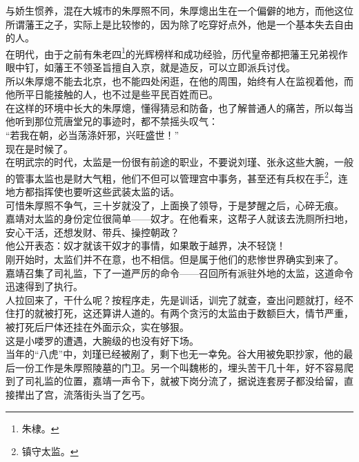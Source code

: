 \begin{multicols}{\theparacolNo}
与娇生惯养，混在大城市的朱厚照不同，朱厚熜出生在一个偏僻的地方，而他这位所谓藩王之子，实际上是比较惨的，因为除了吃穿好点外，他是一个基本失去自由的人。\\

在明代，由于之前有朱老四\footnote{朱棣。}的光辉榜样和成功经验，历代皇帝都把藩王兄弟视作眼中钉，如藩王不领圣旨擅自入京，就是造反，可以立即派兵讨伐。\\

所以朱厚熜不能去北京，也不能四处闲逛，在他的周围，始终有人在监视着他，而他所平日能接触的人，也不过是些平民百姓而已。\\

在这样的环境中长大的朱厚熜，懂得猜忌和防备，也了解普通人的痛苦，所以每当他听到那位荒唐堂兄的事迹时，都不禁摇头叹气：\\

“若我在朝，必当荡涤奸邪，兴旺盛世！”\\

现在是时候了。\\

在明武宗的时代，太监是一份很有前途的职业，不要说刘瑾、张永这些大腕，一般的管事太监也是财大气粗，他们不但可以管理宫中事务，甚至还有兵权在手\footnote{镇守太监。}，连地方都指挥使也要听这些武装太监的话。\\

可惜朱厚照不争气，三十岁就没了，上面换了领导，于是梦醒之后，心碎无痕。\\

嘉靖对太监的身份定位很简单——奴才。在他看来，这帮子人就该去洗厕所扫地，安心干活，还想发财、带兵、操控朝政？\\

他公开表态：奴才就该干奴才的事情，如果敢于越界，决不轻饶！\\

刚开始时，太监们并不在意，也不相信。但是属于他们的悲惨世界确实到来了。\\

嘉靖召集了司礼监，下了一道严厉的命令——召回所有派驻外地的太监，这道命令迅速得到了执行。\\

人拉回来了，干什么呢？按程序走，先是训话，训完了就查，查出问题就打，经不住打的就被打死，这还算讲人道的。有两个贪污的太监由于数额巨大，情节严重，被打死后尸体还挂在外面示众，实在够狠。\\

这是小喽罗的遭遇，大腕级的也没有好下场。\\

当年的“八虎”中，刘瑾已经被剐了，剩下也无一幸免。谷大用被免职抄家，他的最后一份工作是朱厚照陵墓的门卫。另一个叫魏彬的，埋头苦干几十年，好不容易爬到了司礼监的位置，嘉靖一声令下，就被下岗分流了，据说连套房子都没给留，直接撵出了宫，流落街头当了乞丐。\\


\end{multicols}
